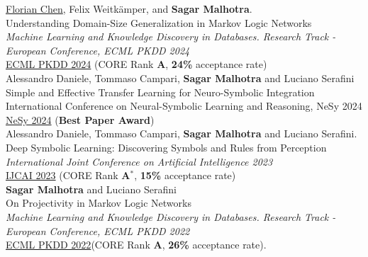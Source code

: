 \documentclass[10pt, a4paper]{article}
\newcommand{\years}[1]{\marginnote{\scriptsize #1}}
\begin{document}
\years{2024}\underline{Florian Chen}, Felix Weitkämper, and \textbf{Sagar Malhotra}.\\
Understanding Domain-Size Generalization in Markov Logic Networks\\
\emph{Machine Learning and Knowledge Discovery in Databases. Research Track - European Conference, ECML PKDD 2024} \\
\href{https://arxiv.org/abs/2403.15933}{ECML PKDD 2024} (CORE Rank \textbf{A}, \textbf{24\%} acceptance rate)\\

\years{2024}Alessandro Daniele, Tommaso Campari, \textbf{Sagar Malhotra} and Luciano Serafini\\
Simple and Effective Transfer Learning for Neuro-Symbolic Integration\\
International Conference on Neural-Symbolic Learning and Reasoning, NeSy 2024\\
\href{https://arxiv.org/abs/2402.14047}{NeSy 2024} (\textbf{Best Paper Award})\\ 

\years{2023}Alessandro Daniele, Tommaso Campari, \textbf{Sagar Malhotra} and Luciano Serafini. \\ Deep Symbolic Learning: Discovering Symbols and Rules from Perception \\ 
\emph{International Joint Conference on Artificial Intelligence 2023}\\
\href{https://www.ijcai.org/proceedings/2023/400}{IJCAI 2023} (CORE Rank \textbf{A$^{*}$}, \textbf{15\%} acceptance rate)\\ 



\years{2022}\textbf{Sagar Malhotra} and Luciano Serafini\\
 On Projectivity in Markov Logic Networks \\ \emph{Machine Learning and Knowledge Discovery in Databases. Research Track - European Conference, ECML PKDD 2022} \\  
\href{https://link.springer.com/chapter/10.1007/978-3-031-26419-1_14}{ECML PKDD 2022}(CORE Rank \textbf{A}, \textbf{26\%} acceptance rate).\\ 
\end{document}
